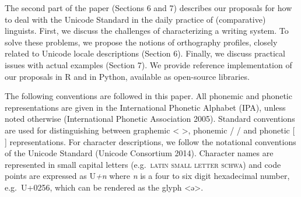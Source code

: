The second part of the paper (Sections 6 and 7) describes our proposals for how to deal with the Unicode Standard in the daily practice of (comparative) linguists. First, we discuss the challenges of characterizing a writing system. To solve these problems, we propose the notions of orthography profiles, closely related to Unicode locale descriptions (Section 6). Finally, we discuss practical issues with actual examples (Section 7). We provide reference implementation of our proposals in R and in Python, available as open-source libraries.

The following conventions are followed in this paper. All phonemic and phonetic representations are given in the International Phonetic Alphabet (IPA), unless noted otherwise (International Phonetic Association 2005). Standard conventions are used for distinguishing between graphemic < >, phonemic / / and phonetic [ ] representations. For character descriptions, we follow the notational conventions of the Unicode Standard (Unicode Consortium 2014). Character names are represented in small capital letters (e.g.~\textsc{latin small letter schwa}) and code points are expressed as U\emph{+n} where \emph{n} is a four to six digit hexadecimal number, e.g.~U+0256, which can be rendered as the glyph <ə>.
